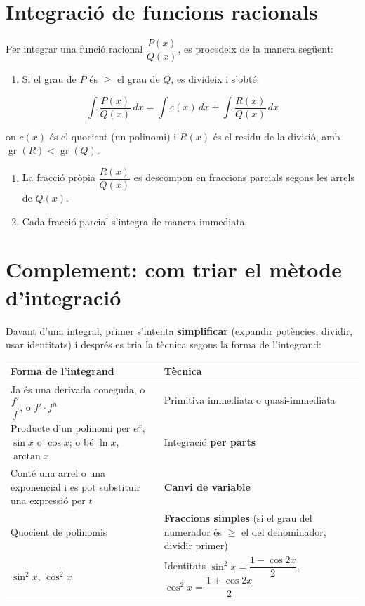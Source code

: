 \section{Integració de funcions racionals}

Per integrar una funció racional $\dfrac{P(x)}{Q(x)}$, es procedeix de la manera següent:

\begin{enumerate}
\item Si el grau de $P$ és $\ge$ el grau de $Q$, es divideix i s'obté:
\end{enumerate}

\begin{equation*}
\int \frac{P(x)}{Q(x)}\,dx = \int c(x)\,dx + \int \frac{R(x)}{Q(x)}\,dx
\end{equation*}

on $c(x)$ és el quocient (un polinomi) i $R(x)$ és el residu de la divisió, amb $\operatorname{gr}(R) < \operatorname{gr}(Q)$.

\begin{enumerate}
\item La fracció pròpia $\dfrac{R(x)}{Q(x)}$ es descompon en fraccions parcials segons les arrels de $Q(x)$.
\item Cada fracció parcial s'integra de manera immediata.
\end{enumerate}

\section{Complement: com triar el mètode d'integració}

Davant d'una integral, primer s'intenta \textbf{simplificar} (expandir potències, dividir, usar identitats) i després es tria la tècnica segons la forma de l'integrand:

\begin{table}[!htbp]
\centering
\renewcommand{\arraystretch}{1.75}
\begin{tabularx}{\textwidth}{>{\raggedright\arraybackslash}X>{\raggedright\arraybackslash}X}
\toprule
Forma de l'integrand & Tècnica \\
\midrule
Ja és una derivada coneguda, o $\displaystyle \dfrac{f'}{f}$, o $\displaystyle f'\cdot f^n$ & Primitiva immediata o quasi-immediata \\
Producte d'un polinomi per $e^x$, $\sin x$ o $\cos x$; o bé $\ln x$, $\arctan x$ & Integració \textbf{per parts} \\
Conté una arrel o una exponencial i es pot substituir una expressió per $t$ & \textbf{Canvi de variable} \\
Quocient de polinomis & \textbf{Fraccions simples} (si el grau del numerador és $\ge$ el del denominador, dividir primer) \\
$\sin^2x$, $\cos^2x$ & Identitats $\displaystyle \sin^2x=\dfrac{1-\cos2x}{2}$, $\displaystyle \cos^2x=\dfrac{1+\cos2x}{2}$ \\
\bottomrule
\end{tabularx}
\end{table}

